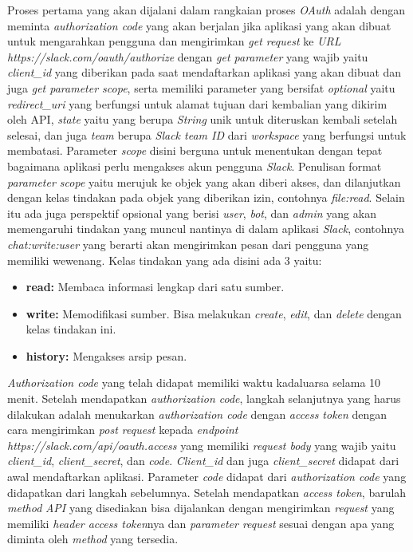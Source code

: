 \documentclass[a4paper,twoside]{article}
\begin{document}
\begin{enumerate}
		Proses pertama yang akan dijalani dalam rangkaian proses \textit{OAuth} adalah dengan meminta \textit{authorization code} yang akan berjalan jika aplikasi yang akan dibuat untuk mengarahkan pengguna dan mengirimkan \textit{get request} ke \textit{URL} \textit{https://slack.com/oauth/authorize} dengan \textit{get parameter} yang wajib yaitu \textit{client\_id} yang diberikan pada saat mendaftarkan aplikasi yang akan dibuat dan juga \textit{get parameter scope}, serta memiliki parameter yang bersifat \textit{optional} yaitu \textit{redirect\_uri} yang berfungsi untuk alamat tujuan dari kembalian yang dikirim oleh API, \textit{state} yaitu yang berupa \textit{String} unik untuk diteruskan kembali setelah selesai, dan juga \textit{team} berupa \textit{Slack team ID} dari \textit{workspace} yang berfungsi untuk membatasi. Parameter \textit{scope} disini berguna untuk menentukan dengan tepat bagaimana aplikasi perlu mengakses akun pengguna \textit{Slack}. Penulisan format \textit{parameter scope} yaitu merujuk ke objek yang akan diberi akses, dan dilanjutkan dengan kelas tindakan pada objek yang diberikan izin, contohnya \textit{file:read}. Selain itu ada juga perspektif opsional yang berisi \textit{user}, \textit{bot}, dan \textit{admin} yang akan memengaruhi tindakan yang muncul nantinya di dalam aplikasi \textit{Slack}, contohnya \textit{chat:write:user} yang berarti akan mengirimkan pesan dari pengguna yang memiliki wewenang. Kelas tindakan yang ada disini ada 3 yaitu:
\begin{itemize}
	\item \textbf{read:} Membaca informasi lengkap dari satu sumber. 
	\item \textbf{write:} Memodifikasi sumber. Bisa melakukan \textit{create}, \textit{edit}, dan \textit{delete} dengan kelas tindakan ini. 
	\item \textbf{history:} Mengakses arsip pesan. 
\end{itemize} 

\textit{Authorization code} yang telah didapat memiliki waktu kadaluarsa selama 10 menit. Setelah mendapatkan \textit{authorization code}, langkah selanjutnya yang harus dilakukan adalah menukarkan \textit{authorization code} dengan \textit{access token} dengan cara mengirimkan \textit{post request} kepada \textit{endpoint} \textit{https://slack.com/api/oauth.access} yang memiliki \textit{request body} yang wajib yaitu \textit{client\_id}, \textit{client\_secret}, dan \textit{code}. \textit{Client\_id} dan juga \textit{client\_secret} didapat dari awal mendaftarkan aplikasi. Parameter \textit{code} didapat dari \textit{authorization code} yang didapatkan dari langkah sebelumnya. Setelah mendapatkan \textit{access token}, barulah \textit{method} \textit{API} yang disediakan bisa dijalankan dengan mengirimkan \textit{request} yang memiliki \textit{header access token}nya dan \textit{parameter request} sesuai dengan apa yang diminta oleh \textit{method} yang tersedia.


\end{enumerate}
\end{document}
